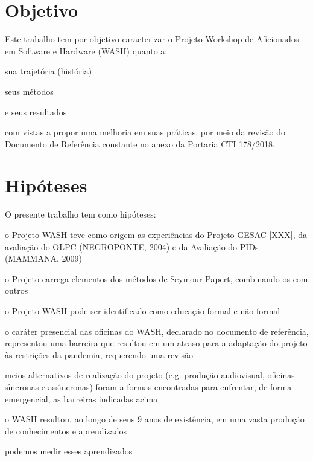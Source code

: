 \documentclass[
12pt,		%
openright,	%
twoside,  %
a4paper,			%
chapter=TITLE,		%
english,			%
french,				%
spanish,			%
brazil				%
]{USPSC-classe/USPSC_RedarTex}
\begin{document}
\section[Objetivo]{Objetivo}\label{Objetivo}
Este trabalho tem por objetivo caracterizar  o Projeto Workshop de Aficionados em Software e Hardware (WASH) quanto a:











\begin{alineas}
\item sua trajet\'oria (hist\'oria)
\item seus m\'etodos
\item e seus resultados
\end{alineas}

com vistas a propor uma melhoria em suas pr\'aticas, por meio da revis\~ao do Documento de Refer\^encia constante no anexo da Portaria CTI 178/2018.










\section[Hip\'oteses]{Hip\'oteses}\label{Hip\'oteses}
O presente trabalho tem como hip\'oteses:











\begin{alineas}
\item o Projeto WASH teve como origem as experi\^encias do Projeto GESAC [XXX], da avalia\c{c}\~ao do OLPC (NEGROPONTE, 2004) e da Avalia\c{c}\~ao do PIDs (MAMMANA, 2009)
\item o Projeto carrega elementos dos m\'etodos de Seymour Papert, combinando-os com outros
\item o Projeto WASH pode ser identificado como \textquotedbl educa\c{c}\~ao  formal e n\~ao-formal
\item o car\'ater presencial das oficinas do WASH, declarado no documento de refer\^encia, representou uma barreira que resultou em um atraso para a adapta\c{c}\~ao do projeto \`as restri\c{c}\~oes da pandemia, requerendo uma revis\~ao
\item meios alternativos de realiza\c{c}\~ao do projeto (e.g. produ\c{c}\~ao audiovisual, oficinas s\'{\i}ncronas e ass\'{\i}ncronas) foram a formas encontradas para enfrentar, de forma emergencial, as barreiras indicadas acima
\item o WASH resultou, ao longo de seus 9 anos de exist\^encia, em uma vasta produ\c{c}\~ao de conhecimentos e aprendizados
\item podemos medir  esses aprendizados 
\end{alineas}
\end{document}
